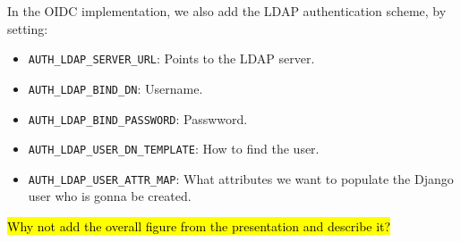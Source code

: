 In the OIDC implementation, we also add the LDAP authentication scheme, by setting:

\begin{itemize}

	\item \verb|AUTH_LDAP_SERVER_URL|: Points to the LDAP server.

	\item \verb|AUTH_LDAP_BIND_DN|: Username.

	\item \verb|AUTH_LDAP_BIND_PASSWORD|: Passwword.

	\item \verb|AUTH_LDAP_USER_DN_TEMPLATE|: How to find the user.

	\item \verb|AUTH_LDAP_USER_ATTR_MAP|: What attributes we want to populate the Django user who is gonna be created.

\end{itemize}

\hl{Why not add the overall figure from the presentation and describe it?}
